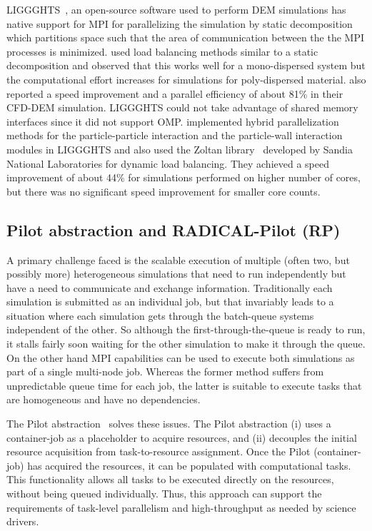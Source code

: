 \documentclass[preprint,11pt,authoryear]{elsarticle}
\begin{document}
LIGGGHTS~\citep{Kloss2012}, an open-source software used to perform DEM simulations has native 
support for MPI for parallelizing the simulation by static decomposition which partitions space such that 
the area of communication between the the MPI processes is minimized. \cite{kacianauskas2010} used 
load balancing methods similar to a static decomposition and observed that this works well for a 
mono-dispersed system but the computational effort increases for simulations for poly-dispersed 
material. \cite{Gopalakrishnan2013} also reported a speed improvement and a parallel efficiency of about 
81\% in their CFD-DEM simulation. LIGGGHTS could not take advantage of shared memory interfaces 
since it did not support OMP. \cite{Berger2015} implemented hybrid parallelization methods for the 
particle-particle interaction and the particle-wall interaction modules in LIGGGHTS and also used the 
Zoltan library~\citep{Boman2012} developed by Sandia National Laboratories for dynamic load 
balancing. They achieved a speed improvement of about 44\% for simulations performed on higher 
number of cores, but there was no significant speed improvement for smaller core counts. 

\subsection{Pilot abstraction and RADICAL-Pilot (RP)}
A primary challenge faced is the scalable execution of multiple (often two,
but possibly more) heterogeneous simulations that need to run independently
but have a need to communicate and exchange information. Traditionally each
simulation is submitted as an individual job, but that invariably leads
to a situation where each simulation gets through the batch-queue systems
independent of the other. So although the first-through-the-queue is ready to
run, it stalls fairly soon waiting for the other simulation to make it through
the queue.  On the other hand MPI capabilities can be used to  execute both
simulations as part of a single multi-node job.  Whereas the former
method suffers from unpredictable queue time for each job, the latter is
suitable to execute tasks that are homogeneous and have no dependencies.


The Pilot abstraction~\citep{pstar12} solves these issues. The Pilot abstraction 
(i) uses a container-job as a placeholder to acquire resources, and (ii) decouples 
the initial resource acquisition from task-to-resource assignment. Once the 
Pilot (container-job) has acquired the resources, it can be populated with 
computational tasks. This functionality allows all tasks to be executed directly 
on the resources, without being queued individually. Thus, this approach can support 
the requirements of task-level parallelism and high-throughput as needed by 
science drivers.
\end{document}
